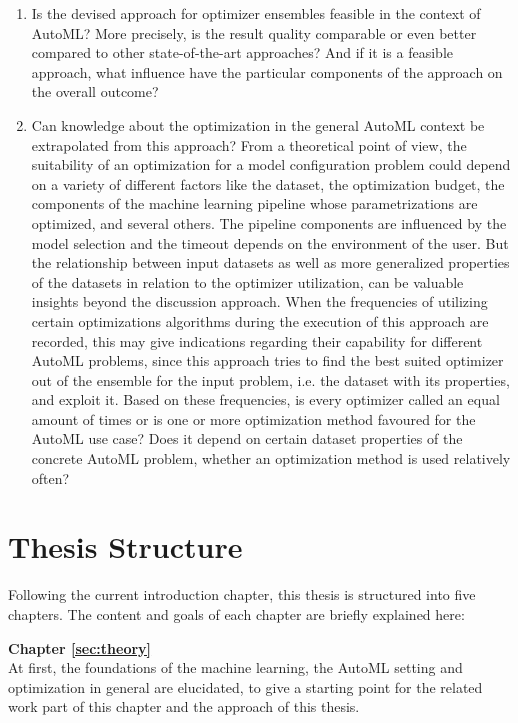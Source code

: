 \begin{enumerate}
    \item Is the devised approach for optimizer ensembles feasible in the context of AutoML?
    More precisely, is the result quality comparable or even better compared to other state-of-the-art approaches?
    And if it is a feasible approach, what influence have the particular components of the approach on the overall outcome?
    \item Can knowledge about the optimization in the general AutoML context be extrapolated from this approach?
    From a theoretical point of view, the suitability of an optimization for a model configuration problem could depend on a variety of different factors like the dataset, the optimization budget, the components of the machine learning pipeline whose parametrizations are optimized, and several others.
    The pipeline components are influenced by the model selection and the timeout depends on the environment of the user.
    But the relationship between input datasets as well as more generalized properties of the datasets in relation to the optimizer utilization, can be valuable insights beyond the discussion approach.\newline
    When the frequencies of utilizing certain optimizations algorithms during the execution of this approach are recorded, this may give indications regarding their capability for different AutoML problems, since this approach tries to find the best suited optimizer out of the ensemble for the input problem, i.e. the dataset with its properties, and exploit it.
    Based on these frequencies, is every optimizer called an equal amount of times or is one or more optimization method favoured for the AutoML use case?
    Does it depend on certain dataset properties of the concrete AutoML problem, whether an optimization method is used relatively often?
\end{enumerate}

\section{Thesis Structure}
\label{sec:intro:structure}
Following the current introduction chapter, this thesis is structured into five chapters.
The content and goals of each chapter are briefly explained here:

\textbf{Chapter \ref{sec:theory}} \\[0.2em]
At first, the foundations of the machine learning, the AutoML setting and optimization in general are elucidated, to give a starting point for the related work part of this chapter and the approach of this thesis.

